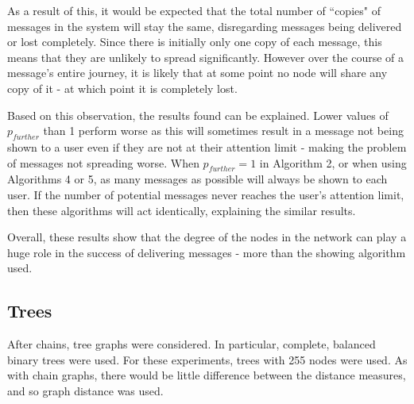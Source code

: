 \documentclass[bsc,frontabs,twoside,singlespacing,parskip,deptreport]{infthesis}     %
\begin{document}
As a result of this, it would be expected that the total number of ``copies" of messages in the system will stay the same, disregarding messages being delivered or lost completely. Since there is initially only one copy of each message, this means that they are unlikely to spread significantly. However over the course of a message's entire journey, it is likely that at some point no node will share any copy of it - at which point it is completely lost.

Based on this observation, the results found can be explained. Lower values of $p_{further}$ than 1 perform worse as this will sometimes result in a message not being shown to a user even if they are not at their attention limit - making the problem of messages not spreading worse. When $p_{further}=1$ in Algorithm 2, or when using Algorithms 4 or 5, as many messages as possible will always be shown to each user. If the number of potential messages never reaches the user's attention limit, then these algorithms will act identically, explaining the similar results.

Overall, these results show that the degree of the nodes in the network can play a huge role in the success of delivering messages - more than the showing algorithm used.

\subsection{Trees}
After chains, tree graphs were considered. In particular, complete, balanced binary trees were used. For these experiments, trees with 255 nodes were used. As with chain graphs, there would be little difference between the distance measures, and so graph distance was used.
\end{document}
